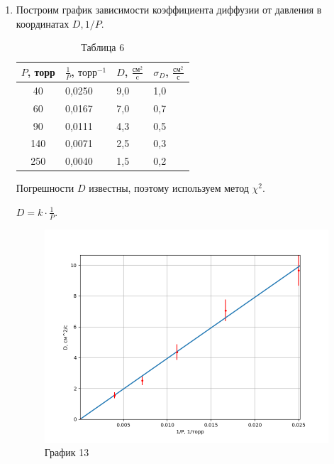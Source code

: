 \documentclass[a4paper,12pt]{article} %
\begin{document}
\begin{enumerate}
\newpage

\item Построим график зависимости коэффициента диффузии от давления в координатах $D, 1/P$.

\begin{table}[h!]
	\centering
	\begin{tabular}{|c|l|l|l|}
		\hline
		$P$, торр & \multicolumn{1}{c|}{$\frac{1}{P}$,  $\text{торр}^{-1}$} & \multicolumn{1}{c|}{$D$, $\frac{\text{см}^2}{\text{c}}$} & \multicolumn{1}{c|}{$\sigma_{D}$, $\frac{\text{см}^2}{\text{с}}$} \\ \hline
		40        & 0,0250                                                  & 9,0                                                      & 1,0                                                               \\ \hline
		60        & 0,0167                                                  & 7,0                                                      & 0,7                                                               \\ \hline
		90        & 0,0111                                                  & 4,3                                                      & 0,5                                                               \\ \hline
		140       & 0,0071                                                  & 2,5                                                      & 0,3                                                               \\ \hline
		250       & 0,0040                                                  & 1,5                                                      & 0,2                                                               \\ \hline
	\end{tabular}
\caption*{Таблица 6}
\end{table}

Погрешности $D$ известны, поэтому используем метод $\chi^2$.


$D = k\cdot \frac{1}{P}$.

\begin{figure}[h!]
	\centering
	\includegraphics[scale=0.8]{D(P).png}
	\caption*{График 13}
\end{figure}


\end{enumerate}
\end{document}
